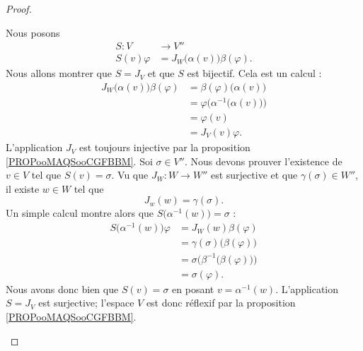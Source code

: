 \begin{proof}
\begin{subproof}
		\spitem[Le \( S\)]
		Nous posons
		\begin{equation}
			\begin{aligned}
				S\colon V   & \to V''                                  \\
				S(v)\varphi & =J_W\big( \alpha(v) \big)\beta(\varphi).
			\end{aligned}
		\end{equation}
		Nous allons montrer que \( S=J_V\) et que \( S\) est bijectif.
		\spitem[\( S=J_V\)]
		Cela est un calcul :
		\begin{subequations}
			\begin{align}
				J_W\big( \alpha(v) \big)\beta(\varphi) & =\beta(\varphi)\big( \alpha(v) \big)                 \\
				                                       & =\varphi\Big( \alpha^{-1}\big( \alpha(v) \big) \Big) \\
				                                       & =\varphi(v)                                          \\
				                                       & =J_V(v)\varphi.
			\end{align}
		\end{subequations}
		L'application \( J_V\) est toujours injective par la proposition \ref{PROPooMAQSooCGFBBM}.
		Soi \( \sigma\in V''\). Nous devons prouver l'existence de \( v\in V\) tel que \( S(v)=\sigma\). Vu que \( J_W\colon W\to W''\) est surjective et que \( \gamma(\sigma)\in W''\), il existe \( w\in W\) tel que
		\begin{equation}
			J_w(w)=\gamma(\sigma).
		\end{equation}
		Un simple calcul montre alors que \( S\big( \alpha^{-1}(w) \big)=\sigma\) :
		\begin{subequations}
			\begin{align}
				S\big( \alpha^{-1}(w) \big)\varphi & =J_W(w)\beta(\varphi)                                   \\
				                                   & =\gamma(\sigma)\big( \beta(\varphi) \big)               \\
				                                   & =\sigma\Big( \beta^{-1}\big( \beta(\varphi) \big) \Big) \\
				                                   & =\sigma(\varphi).
			\end{align}
		\end{subequations}
		Nous avons donc bien que \( S(v)=\sigma\) en posant \( v=\alpha^{-1}(w)\).
		\spitem[Conclusion]
		L'application \( S=J_V\) est surjective; l'espace \( V\) est donc réflexif par la proposition \ref{PROPooMAQSooCGFBBM}.
	\end{subproof}
\end{proof}

